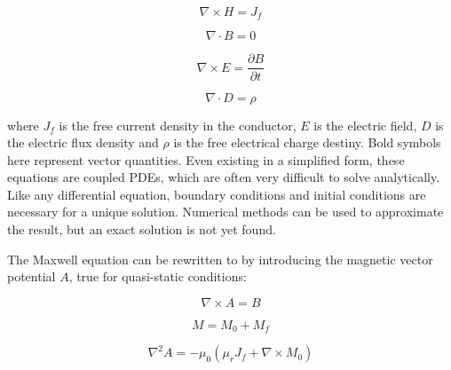     
        \begin{equation}
            \nabla \times H = J_f
            \label{eq:ampere's circuit law}
        \end{equation}
        
        \begin{equation}
            \nabla \cdot B = 0
            \label{eq:gauss's magnetism law}
        \end{equation}
        
        \begin{equation}
            \nabla \times E = \frac{\partial B}{\partial t}
            \label{eq:maxwell-faraday's law}
        \end{equation}
    
        \begin{equation}
            \nabla \cdot D = \rho
            \label{eq:gauss's law}
        \end{equation}
    
    
        where $J_f$ is the free current density in the conductor, $E$ is the electric field, $D$ is the electric flux density and $\rho$ is the free electrical charge destiny. Bold symbols here represent vector quantities. Even existing in a simplified form, these equations are coupled \acsp{PDE}, which are often very difficult to solve analytically. Like any differential equation, boundary conditions and initial conditions are necessary for a unique solution. Numerical methods can be used to approximate the result, but an exact solution is not yet found.
        
        
        The Maxwell equation can be rewritten to by introducing the magnetic vector potential $A$, true for quasi-static conditions:
        
        
        \begin{equation}
            \nabla \times A = B
            \label{eq:curl of A is B}
        \end{equation}        
        
        \begin{equation}
            M = M_0 + M_f
            \label{eq:component of magnetization}
        \end{equation}     
        
        \begin{equation}
            {\nabla}^2 A = -{\mu}_0 ({\mu}_r J_f + \nabla \times M_0)
            \label{eq:relation of A to Magnetization and free current}
        \end{equation}        
        
